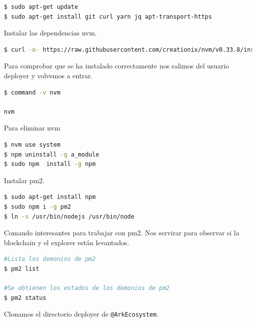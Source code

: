 \begin{lstlisting}[language=Bash,caption=Instalación Blockchain. Parte IV, label=cod:suma-cuerpo, style=Consola]
$ sudo apt-get update
$ sudo apt-get install git curl yarn jq apt-transport-https
\end{lstlisting}

Instalar las dependencias nvm.\\

\begin{lstlisting}[language=Bash,caption=Instalación Blockchain. Parte V, label=cod:suma-cuerpo, style=Consola]
$ curl -o- https://raw.githubusercontent.com/creationix/nvm/v0.33.8/install.sh | bash
\end{lstlisting}

Para comprobar que se ha instalado correctamente nos salimos del usuario deployer y volvemos a entrar.\\

\begin{lstlisting}[language=Bash,caption=Instalación Blockchain. Parte VI, label=cod:suma-cuerpo, style=Consola]
$ command -v nvm

nvm
\end{lstlisting}

Para eliminar nvm
\begin{lstlisting}[language=Bash,caption=Instalación Blockchain. Parte VII, label=cod:suma-cuerpo, style=Consola]
$ nvm use system
$ npm uninstall -g a_module
$ sudo npm  install -g npm
\end{lstlisting}

Instalar pm2.\\

\begin{lstlisting}[language=Bash,caption=Instalación Blockchain. Parte VIII, label=cod:suma-cuerpo, style=Consola]
$ sudo apt-get install npm
$ sudo npm i -g pm2
$ ln -s /usr/bin/nodejs /usr/bin/node
\end{lstlisting}

Comando interesantes para trabajar con pm2. Nos servirar para observar si la blockchain y el explorer están levantados.

\begin{lstlisting}[language=Bash,caption=Comandos pm2, label=cod:suma-cuerpo, style=Consola]
#Lista los demonios de pm2
$ pm2 list

#Se obtienen los estados de los demonios de pm2
$ pm2 status
\end{lstlisting}

Clonamos el directorio deployer de \texttt{@ArkEcosystem}.\\

